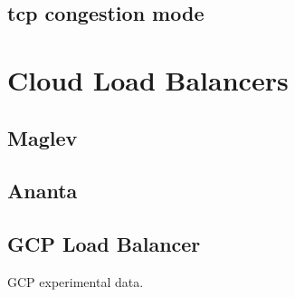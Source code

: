 \subsection{tcp congestion mode}

\section{Cloud Load Balancers}
\subsection{Maglev}
\subsection{Ananta}
\subsection{GCP Load Balancer}
GCP experimental data.
